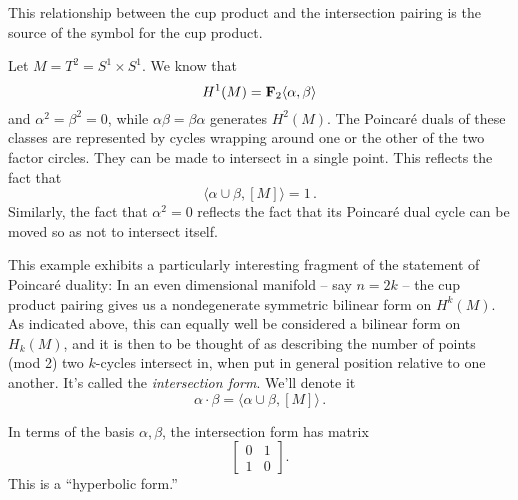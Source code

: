 This relationship between the cup product and the intersection pairing is 
the source of the symbol for the cup product.

\begin{example}
Let $M=T^2=S^1\times S^1$. We know that 
\[
H^1(M)=\mathbf F_2\langle\alpha,\beta\rangle
\]
and $\alpha^2=\beta^2=0$, while $\alpha\beta=\beta\alpha$ generates $H^2(M)$.
The Poincar\'e duals of these classes are represented by cycles wrapping 
around one or the other of the two factor circles. They can be made to 
intersect in a single point. This reflects the fact that 
\[
\langle\alpha\cup\beta,[M]\rangle=1\,.
\]
Similarly, the fact that $\alpha^2=0$ reflects the fact that its Poincar\'e 
dual cycle can be moved so as not to intersect itself. 
\end{example}

This example exhibits a particularly interesting fragment of the statement
of Poincar\'e duality: In an even dimensional manifold -- say $n=2k$ -- the
cup product pairing gives us a nondegenerate symmetric bilinear form on 
$H^k(M)$. As indicated above, this can equally well be considered a bilinear
form on $H_k(M)$, and it is then to be thought of as describing the number of
points (mod 2) two $k$-cycles intersect in, when put in general position 
relative to one another. It's called the {\em intersection form}. We'll 
denote it 
\[
\alpha\cdot\beta=\langle\alpha\cup\beta,[M]\rangle\,.
\]

\begin{example} In terms of the basis $\alpha,\beta$, the intersection form
has matrix 
\[
\left[\begin{array}{cc}0&1\\1&0\end{array}\right].
\]
This is a ``hyperbolic form.'' 
\end{example}


